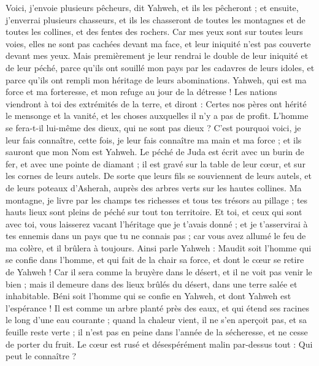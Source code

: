 \begin{multicols}{2}
Voici, j'envoie plusieurs pêcheurs, dit Yahweh, et ils les pêcheront ; et ensuite, j'enverrai plusieurs chasseurs, et ils les chasseront de toutes les montagnes et de toutes les collines, et des fentes des rochers.
Car mes yeux sont sur toutes leurs voies, elles ne sont pas cachées devant ma face, et leur iniquité n'est pas couverte devant mes yeux.
Mais premièrement je leur rendrai le double de leur iniquité et de leur péché, parce qu'ils ont souillé mon pays par les cadavres de leurs idoles, et parce qu'ils ont rempli mon héritage de leurs abominations.
Yahweh, qui est ma force et ma forteresse, et mon refuge au jour de la détresse ! Les nations viendront à toi des extrémités de la terre, et diront : Certes nos pères ont hérité le mensonge et la vanité, et les choses auxquelles il n'y a pas de profit.
L'homme se fera-t-il lui-même des dieux, qui ne sont pas dieux ?
C'est pourquoi voici, je leur fais connaître, cette fois, je leur fais connaître ma main et ma force ; et ils sauront que mon Nom est Yahweh.
\VerseOne{}Le péché de Juda est écrit avec un burin de fer, et avec une pointe de diamant ; il est gravé sur la table de leur cœur, et sur les cornes de leurs autels.
De sorte que leurs fils se souviennent de leurs autels, et de leurs poteaux d'Asherah, auprès des arbres verts sur les hautes collines.
Ma montagne, je livre par les champs tes richesses et tous tes trésors au pillage ; tes hauts lieux sont pleins de péché sur tout ton territoire.
Et toi, et ceux qui sont avec toi, vous laisserez vacant l'héritage que je t'avais donné ; et je t'asservirai à tes ennemis dans un pays que tu ne connais pas ; car vous avez allumé le feu de ma colère, et il brûlera à toujours.
Ainsi parle Yahweh : Maudit soit l'homme qui se confie dans l'homme, et qui fait de la chair sa force, et dont le cœur se retire de Yahweh !
Car il sera comme la bruyère dans le désert, et il ne voit pas venir le bien ; mais il demeure dans des lieux brûlés du désert, dans une terre salée et inhabitable.
Béni soit l'homme qui se confie en Yahweh, et dont Yahweh est l'espérance !
Il est comme un arbre planté près des eaux, et qui étend ses racines le long d'une eau courante ; quand la chaleur vient, il ne s'en aperçoit pas, et sa feuille reste verte ; il n'est pas en peine dans l'année de la sécheresse, et ne cesse de porter du fruit.
Le cœur est rusé et désespérément malin par-dessus tout : Qui peut le connaître ?

\end{multicols}
